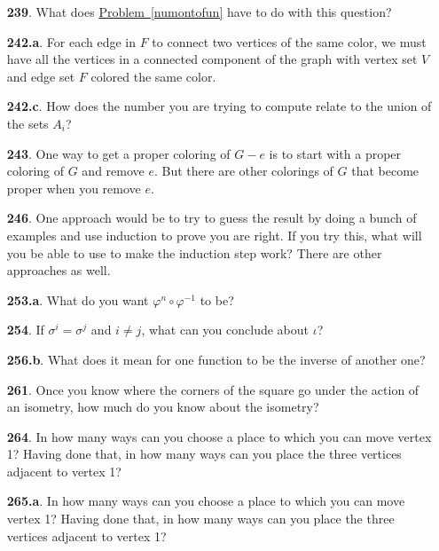 \documentclass[10pt,]{book}
\theoremstyle{plain}
\theoremstyle{definition}
\theoremstyle{definition}
\numberwithin{equation}{chapter}
\begin{document}
\begin{itemize}[itemsep=1em]
\item[\textbf{239}.]\hypertarget{p-1387}{}%
What does \hyperref[numontofun]{Problem~\ref{numontofun}} have to do with this question?%

\item[\textbf{242.a}.]\hypertarget{p-1402}{}%
For each edge in \(F\) to connect two vertices of the same color, we must have all the vertices in a connected component of the graph  with vertex set \(V\) and edge set \(F\) colored the same color.%

\item[\textbf{242.c}.]\hypertarget{p-1407}{}%
How does the number you are trying to compute relate to the union of the sets \(A_i\)?%

\item[\textbf{243}.]\hypertarget{p-1411}{}%
One way to get a proper coloring of \(G-e\) is to start with a proper coloring of \(G\) and remove \(e\). But there are other colorings of \(G\) that become proper when you remove \(e\).%

\item[\textbf{246}.]\hypertarget{p-1422}{}%
One approach would be to try to guess the result by doing a bunch of examples and use induction to prove you are right. If you try this, what will you be able to use to make the induction step work? There are other approaches as well.%

\item[\textbf{253.a}.]\hypertarget{p-1471}{}%
What do you want \(\varphi^n\circ\varphi^{-1}\) to be?%

\item[\textbf{254}.]\hypertarget{p-1482}{}%
If \(\sigma^i = \sigma^j\) and \(i \ne j\), what can you conclude about \(\iota\)?%

\item[\textbf{256.b}.]\hypertarget{p-1491}{}%
What does it mean for one function to be the inverse of another one?%

\item[\textbf{261}.]\hypertarget{p-1510}{}%
Once you know where the corners of the square go under the action of an isometry, how much do you know about the isometry?%

\item[\textbf{264}.]\hypertarget{p-1524}{}%
In how many ways can you choose a place to which you can move vertex 1? Having done that, in how many ways can you place the three vertices adjacent to vertex 1?%

\item[\textbf{265.a}.]\hypertarget{p-1528}{}%
In how many ways can you choose a place to which you can move vertex 1? Having done that, in how many ways can you place the three vertices adjacent to vertex 1?%


\end{itemize}
\end{document}
